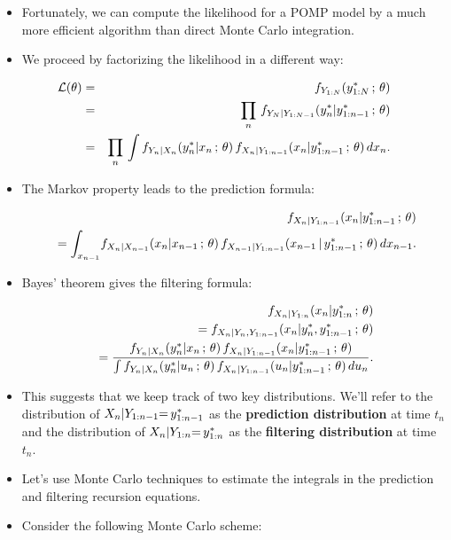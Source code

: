 \documentclass[]{article}
\providecommand{\tightlist}{%
  \setlength{\itemsep}{0pt}\setlength{\parskip}{0pt}}
\begin{document}
\begin{itemize}
\item
  Fortunately, we can compute the likelihood for a POMP model by a much
  more efficient algorithm than direct Monte Carlo integration.
\item
  We proceed by factorizing the likelihood in a different way:
\end{itemize}

\begin{eqnarray}
\mathcal{L}(\theta)&=&f_{Y_{1:N}}(y^*_{1:N}\, ; \, \theta)
\\
&=&
\prod_{n}\,f_{Y_N|Y_{1:N-1}}(y^*_n|y^*_{1:n-1}\, ; \,\theta) 
\\
&=&
\prod_{n}\,\int f_{Y_n|X_n}(y^*_n|x_n\, ; \,\theta)\,f_{X_n|Y_{1:n-1}}(x_n|y^*_{1:n-1}\, ; \,\theta)\, dx_{n}.
\end{eqnarray}

\begin{itemize}
\tightlist
\item
  The Markov property leads to the prediction formula:
\end{itemize}

\begin{eqnarray}
&&f_{X_n|Y_{1:n-1}}(x_n|y^*_{1:n-1}\, ; \, \theta) 
\\
&&\quad
= \int_{x_{n-1}} \! f_{X_n|X_{n-1}}(x_n|x_{n-1}\, ; \,\theta)\, f_{X_{n-1}|Y_{1:n-1}}(x_{n-1}{\, | \,} y^*_{1:n-1}\, ; \, \theta) \, dx_{n-1}.
\end{eqnarray}

\begin{itemize}
\tightlist
\item
  Bayes' theorem gives the filtering formula:
\end{itemize}

\begin{eqnarray}
&&f_{X_n|Y_{1:n}}(x_n|y^*_{1:n}\, ; \, \theta)
\\
&&\quad = f_{X_n|Y_n,Y_{1:n-1}}(x_n|y^*_n,y^*_{1:n-1}\, ; \, \theta) 
\\
&&\quad =\frac{f_{Y_n|X_n}(y^*_{n}|x_{n}\, ; \,\theta)\,f_{X_n|Y_{1:n-1}}(x_{n}|y^*_{1:n-1}\, ; \,\theta)}{\int
f_{Y_n|X_n}(y^*_{n}|u_{n}\, ; \,\theta)\,f_{X_n|Y_{1:n-1}}(u_{n}|y^*_{1:n-1}\, ; \,\theta)\, du_n}.
\end{eqnarray}

\begin{itemize}
\item
  This suggests that we keep track of two key distributions. We'll refer
  to the distribution of \(X_n | Y_{1:n-1}{=\,} y^*_{1:n-1}\) as the
  \textbf{prediction distribution} at time \(t_n\) and the distribution
  of \(X_{n} | Y_{1:n}{=\,} y^*_{1:n}\) as the \textbf{filtering
  distribution} at time \(t_n\).
\item
  Let's use Monte Carlo techniques to estimate the integrals in the
  prediction and filtering recursion equations.
\item
  Consider the following Monte Carlo scheme:
\end{itemize}
\end{document}
